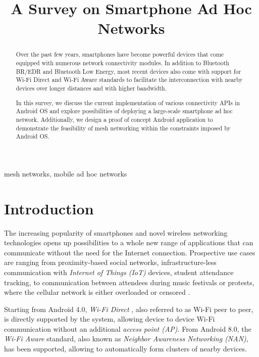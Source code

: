 \documentclass[conference,compsoc]{IEEEtran}
\begin{document}
 
\title{A Survey on Smartphone Ad Hoc Networks}

\author{
}

\maketitle

\begin{abstract}
Over the past few years, smartphones have become powerful devices that come equipped with numerous network connectivity modules. In addition to Bluetooth BR/EDR and Bluetooth Low Energy, most recent devices also come with support for Wi-Fi Direct and Wi-Fi Aware standards to facilitate the interconnection with nearby devices over longer distances and with higher bandwidth. 

In this survey, we discuss the current implementation of various connectivity APIs in Android OS and explore possibilities of deploying a large-scale smartphone ad hoc network. Additionally, we design a proof of concept Android application to demonstrate the feasibility of mesh networking within the constraints imposed by Android OS.

\end{abstract}

\begin{IEEEkeywords}mesh networks, mobile ad hoc networks\end{IEEEkeywords}

\section{Introduction}


The increasing popularity of smartphones and novel wireless networking technologies opens up possibilities to a whole new range of applications that can communicate without the need for the Internet connection. Prospective use cases are ranging from proximity-based social networks, infrastructure-less communication with \textit{Internet of Things (IoT)} devices, student attendance tracking, to communication between attendees during music festivals or protests, where the cellular network is either overloaded or censored \cite{forbes:hk}. 

Starting from Android 4.0, \textit{Wi-Fi Direct} \cite{android:wifip2p}, also referred to as Wi-Fi peer to peer, is directly supported by the system, allowing device to device Wi-Fi communication without an additional \textit{access point (AP)}. From Android 8.0, the \textit{Wi-Fi Aware} \cite{android:wifiaware} standard, also known as \textit{Neighbor Awareness Networking (NAN)}, has been supported, allowing to automatically form clusters of nearby devices.
\end{document}
